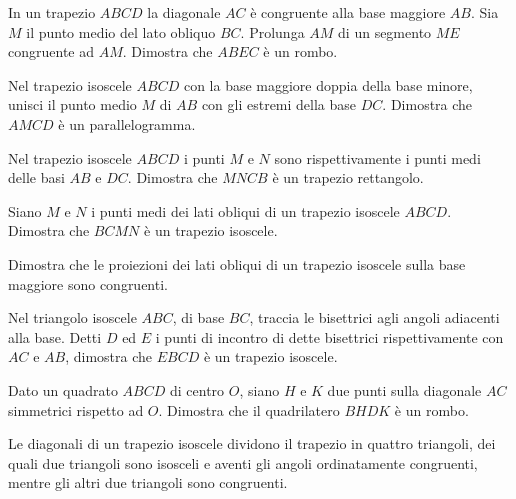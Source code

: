 \begin{multicols}{2}
\begin{esercizio}
\label{ese:4.27}
In un trapezio \(ABCD\) la diagonale \(AC\) è congruente alla base 
maggiore \(AB\). Sia \(M\) il punto medio del lato obliquo \(BC\). Prolunga 
\(AM\) di un segmento \(ME\) congruente ad \(AM\). Dimostra che \(ABEC\) è un 
rombo.
\end{esercizio}

\begin{esercizio}
\label{ese:4.28}
Nel trapezio isoscele \(ABCD\) con la base maggiore doppia della base 
minore, unisci il punto medio \(M\) di \(AB\) con gli estremi della base 
\(DC\). Dimostra che \(AMCD\) è un parallelogramma.
\end{esercizio}

\begin{esercizio}
\label{ese:4.29}
Nel trapezio isoscele \(ABCD\) i punti \(M\) e \(N\) sono rispettivamente i 
punti medi delle basi \(AB\) e \(DC\). Dimostra che \(MNCB\) è un trapezio 
rettangolo.
\end{esercizio}

\begin{esercizio}
\label{ese:4.30}
Siano \(M\) e \(N\) i punti medi dei lati obliqui di un trapezio isoscele 
\(ABCD\). Dimostra che \(BCMN\) è un trapezio isoscele.
\end{esercizio}

\begin{esercizio}
\label{ese:4.32}
Dimostra che le proiezioni dei lati obliqui di un trapezio isoscele 
sulla base maggiore sono congruenti.
\end{esercizio}

\begin{esercizio}
\label{ese:4.33}
Nel triangolo isoscele \(ABC\), di base \(BC\), traccia le bisettrici 
agli angoli adiacenti alla base. Detti \(D\) ed \(E\) i punti di incontro 
di dette bisettrici rispettivamente con \(AC\) e \(AB\), dimostra che 
\(EBCD\) è un trapezio isoscele.
\end{esercizio}

\begin{esercizio}
\label{ese:4.41}
Dato un quadrato \(ABCD\) di centro \(O\), siano \(H\) e \(K\) due punti 
sulla diagonale \(AC\) simmetrici rispetto ad \(O\). Dimostra che il 
quadrilatero \(BHDK\) è un rombo. 
\end{esercizio}

\begin{esercizio}
\label{ese:4.48}
Le diagonali di un trapezio isoscele dividono il trapezio in quattro 
triangoli, dei quali due triangoli sono isosceli e aventi gli angoli 
ordinatamente congruenti, mentre gli altri due triangoli sono 
congruenti.
\end{esercizio}


\end{multicols}
